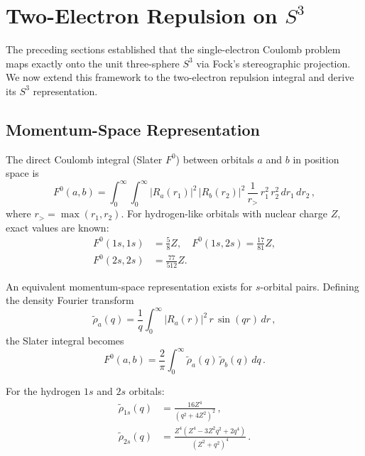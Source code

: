 
\section{Two-Electron Repulsion on $S^3$}
\label{sec:vee_s3}

The preceding sections established that the single-electron Coulomb
problem maps exactly onto the unit three-sphere $S^3$ via Fock's
stereographic projection. We now extend this framework to the
two-electron repulsion integral and derive its $S^3$ representation.

\subsection{Momentum-Space Representation}

The direct Coulomb integral (Slater $F^0$) between orbitals $a$ and $b$
in position space is
\begin{equation}
  F^0(a,b) = \int_0^\infty \!\!\int_0^\infty
  |R_a(r_1)|^2 \, |R_b(r_2)|^2 \, \frac{1}{r_>} \,
  r_1^2 \, r_2^2 \, dr_1 \, dr_2 \,,
  \label{eq:slater_f0}
\end{equation}
where $r_> = \max(r_1, r_2)$. For hydrogen-like orbitals with nuclear
charge $Z$, exact values are known:
\begin{align}
  F^0(1s,1s) &= \tfrac{5}{8}Z, \quad
  F^0(1s,2s) = \tfrac{17}{81}Z, \nonumber\\
  F^0(2s,2s) &= \tfrac{77}{512}Z.
  \label{eq:slater_exact}
\end{align}

An equivalent momentum-space representation exists for $s$-orbital pairs.
Defining the density Fourier transform
\begin{equation}
  \tilde{\rho}_a(q)
  = \frac{1}{q} \int_0^\infty |R_a(r)|^2 \, r \, \sin(qr) \, dr \,,
  \label{eq:density_ft}
\end{equation}
the Slater integral becomes
\begin{equation}
  F^0(a,b) = \frac{2}{\pi} \int_0^\infty
  \tilde{\rho}_a(q) \, \tilde{\rho}_b(q) \, dq \,.
  \label{eq:f0_momentum}
\end{equation}

For the hydrogen $1s$ and $2s$ orbitals:
\begin{align}
  \tilde{\rho}_{1s}(q) &= \frac{16Z^4}{(q^2 + 4Z^2)^2} \,,
  \label{eq:rho1s} \\[4pt]
  \tilde{\rho}_{2s}(q) &= \frac{Z^4(Z^4 - 3Z^2 q^2 + 2q^4)}{(Z^2 + q^2)^4} \,.
  \label{eq:rho2s}
\end{align}

